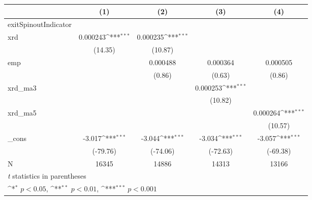 {
\def\sym#1{\ifmmode^{#1}\else\(^{#1}\)\fi}
\begin{tabular}{l*{4}{c}}
\hline\hline
            &\multicolumn{1}{c}{(1)}         &\multicolumn{1}{c}{(2)}         &\multicolumn{1}{c}{(3)}         &\multicolumn{1}{c}{(4)}         \\
\hline
exitSpinoutIndicator&                     &                     &                     &                     \\
xrd         &    0.000243\sym{***}&    0.000235\sym{***}&                     &                     \\
            &     (14.35)         &     (10.87)         &                     &                     \\
[1em]
emp         &                     &    0.000488         &    0.000364         &    0.000505         \\
            &                     &      (0.86)         &      (0.63)         &      (0.86)         \\
[1em]
xrd\_ma3     &                     &                     &    0.000253\sym{***}&                     \\
            &                     &                     &     (10.82)         &                     \\
[1em]
xrd\_ma5     &                     &                     &                     &    0.000264\sym{***}\\
            &                     &                     &                     &     (10.57)         \\
[1em]
\_cons      &      -3.017\sym{***}&      -3.044\sym{***}&      -3.034\sym{***}&      -3.057\sym{***}\\
            &    (-79.76)         &    (-74.06)         &    (-72.63)         &    (-69.38)         \\
\hline
N           &       16345         &       14886         &       14313         &       13166         \\
\hline\hline
\multicolumn{5}{l}{\footnotesize \textit{t} statistics in parentheses}\\
\multicolumn{5}{l}{\footnotesize \sym{*} \(p<0.05\), \sym{**} \(p<0.01\), \sym{***} \(p<0.001\)}\\
\end{tabular}
}

